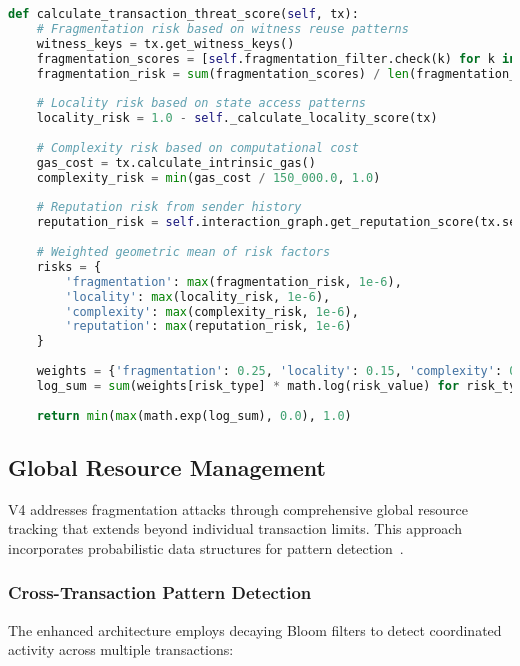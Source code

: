 \documentclass{article}
\begin{document}
\begin{lstlisting}[language=Python,caption={Transaction Threat Score Calculation},label={lst:tts}]
def calculate_transaction_threat_score(self, tx):
    # Fragmentation risk based on witness reuse patterns
    witness_keys = tx.get_witness_keys()
    fragmentation_scores = [self.fragmentation_filter.check(k) for k in witness_keys]
    fragmentation_risk = sum(fragmentation_scores) / len(fragmentation_scores)
    
    # Locality risk based on state access patterns
    locality_risk = 1.0 - self._calculate_locality_score(tx)
    
    # Complexity risk based on computational cost
    gas_cost = tx.calculate_intrinsic_gas()
    complexity_risk = min(gas_cost / 150_000.0, 1.0)
    
    # Reputation risk from sender history
    reputation_risk = self.interaction_graph.get_reputation_score(tx.sender_address)
    
    # Weighted geometric mean of risk factors
    risks = {
        'fragmentation': max(fragmentation_risk, 1e-6),
        'locality': max(locality_risk, 1e-6),
        'complexity': max(complexity_risk, 1e-6),
        'reputation': max(reputation_risk, 1e-6)
    }
    
    weights = {'fragmentation': 0.25, 'locality': 0.15, 'complexity': 0.35, 'reputation': 0.25}
    log_sum = sum(weights[risk_type] * math.log(risk_value) for risk_type, risk_value in risks.items())
    
    return min(max(math.exp(log_sum), 0.0), 1.0)
\end{lstlisting}

\subsection{Global Resource Management}

V4 addresses fragmentation attacks through comprehensive global resource tracking that extends beyond individual transaction limits. This approach incorporates probabilistic data structures for pattern detection~\cite{benbasat2020spacecode}.

\subsubsection{Cross-Transaction Pattern Detection}

The enhanced architecture employs decaying Bloom filters to detect coordinated activity across multiple transactions:
\end{document}
